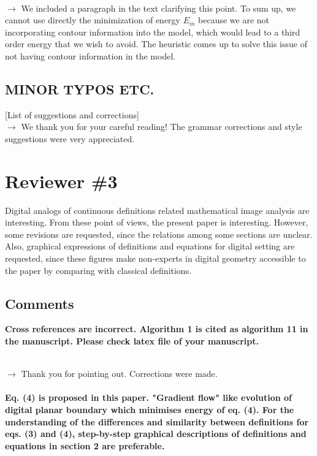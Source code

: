 \documentclass[12pt]{article}
\begin{document}
~\\
$\rightarrow$ We included a paragraph in the text clarifying this point. To sum up, we cannot use directly the minimization of energy $E_m$ because we are not incorporating contour information into the model, which would lead to a third order energy that we wish to avoid. The heuristic comes up to solve this issue of not having contour information in the model.
~\\

\subsection{MINOR TYPOS ETC.}

[List of suggestions and corrections]
~\\

$\rightarrow$ We thank you for your careful reading! The grammar corrections and style suggestions were very appreciated.
~\\



\section{Reviewer \#3}

Digital analogs of continuous definitions related mathematical image analysis are interesting. From these point of views, the present paper is interesting. However, some revisions are requested, since the relations among some sections are unclear. Also, graphical expressions of definitions and equations for digital setting are requested, since these figures make non-experts in digital geometry accessible to the paper by comparing with classical definitions.

\subsection{Comments}

\textbf{Cross references are incorrect. Algorithm 1 is cited as algorithm 11 in the manuscript.
Please check latex file of your manuscript.}

~\\
$\rightarrow$ Thank you for pointing out. Corrections were made.
~\\


~\\
\textbf{Eq. (4) is proposed in this paper.
"Gradient flow" like evolution of digital planar boundary which minimises energy of eq. (4).
For the understanding of the differences and similarity between definitions for eqs. (3) and (4),
step-by-step graphical descriptions of definitions and equations in section 2 are preferable.}
\end{document}
